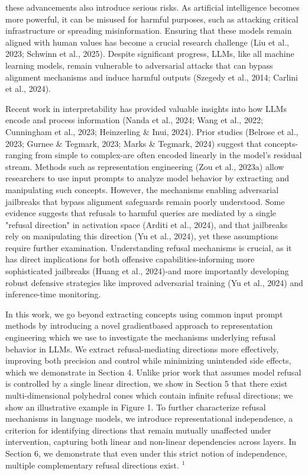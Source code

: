 \documentclass[10pt]{article}
\begin{document}
these advancements also introduce serious risks. As artificial intelligence becomes more powerful, it can be misused for harmful purposes, such as attacking critical infrastructure or spreading misinformation. Ensuring that these models remain aligned with human values has become a crucial research challenge (Liu et al., 2023; Schwinn et al., 2025). Despite significant progress, LLMs, like all machine learning models, remain vulnerable to adversarial attacks that can bypass alignment mechanisms and induce harmful outputs (Szegedy et al., 2014; Carlini et al., 2024).

Recent work in interpretability has provided valuable insights into how LLMs encode and process information (Nanda et al., 2024; Wang et al., 2022; Cunningham et al., 2023; Heinzerling \& Inui, 2024). Prior studies (Belrose et al., 2023; Gurnee \& Tegmark, 2023; Marks \& Tegmark, 2024) suggest that concepts-ranging from simple to complex-are often encoded linearly in the model's residual stream. Methods such as representation engineering (Zou et al., 2023a) allow researchers to use input prompts to analyze model behavior by extracting and manipulating such concepts. However, the mechanisms enabling adversarial jailbreaks that bypass alignment safeguards remain poorly understood. Some evidence suggests that refusals to harmful queries are mediated by a single "refusal direction" in activation space (Arditi et al., 2024), and that jailbreaks rely on manipulating this direction (Yu et al., 2024), yet these assumptions require further examination. Understanding refusal mechanisms is crucial, as it has direct implications for both offensive capabilities-informing more sophisticated jailbreaks (Huang et al., 2024)-and more importantly developing robust defensive strategies like improved adversarial training (Yu et al., 2024) and inference-time monitoring.

In this work, we go beyond extracting concepts using common input prompt methods by introducing a novel gradientbased approach to representation engineering which we use to investigate the mechanisms underlying refusal behavior in LLMs. We extract refusal-mediating directions more effectively, improving both precision and control while minimizing unintended side effects, which we demonstrate in Section 4. Unlike prior work that assumes model refusal is controlled by a single linear direction, we show in Section 5 that there exist multi-dimensional polyhedral cones which contain infinite refusal directions; we show an illustrative example in Figure 1. To further characterize refusal mechanisms in language models, we introduce representational independence, a criterion for identifying directions that remain mutually unaffected under intervention, capturing both linear and non-linear dependencies across layers. In Section 6, we demonstrate that even under this strict notion of independence, multiple complementary refusal directions exist. ${ }^{1}$
\end{document}
